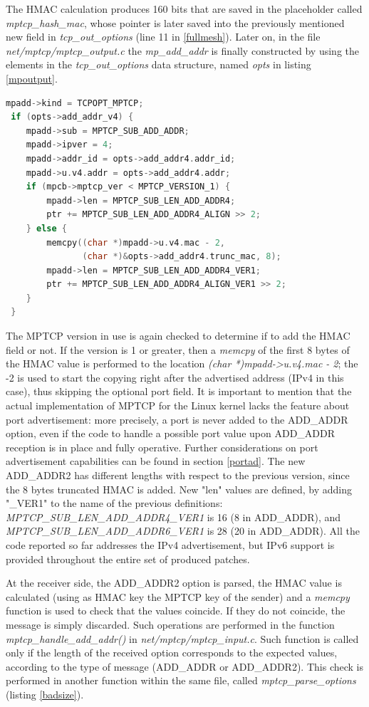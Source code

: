 The HMAC calculation produces 160 bits that are saved in the placeholder called \textit{mptcp\_hash\_mac}, whose pointer is later saved into the previously mentioned new field in \textit{tcp\_out\_options} (line 11 in \ref{fullmesh}).
Later on, in the file \textit{net/mptcp/mptcp\_output.c} the \textit{mp\_add\_addr} is finally constructed by using the elements in the \textit{tcp\_out\_options} data structure, named \textit{opts} in listing \ref{mpoutput}.

\begin{lstlisting}[language=c, caption=\textit{Building ADD\_ADDR2 output message}, label=mpoutput]
 mpadd->kind = TCPOPT_MPTCP;
 if (opts->add_addr_v4) {
 	mpadd->sub = MPTCP_SUB_ADD_ADDR;
 	mpadd->ipver = 4;
 	mpadd->addr_id = opts->add_addr4.addr_id;
 	mpadd->u.v4.addr = opts->add_addr4.addr;
 	if (mpcb->mptcp_ver < MPTCP_VERSION_1) {
 		mpadd->len = MPTCP_SUB_LEN_ADD_ADDR4;
 		ptr += MPTCP_SUB_LEN_ADD_ADDR4_ALIGN >> 2;
 	} else {
 		memcpy((char *)mpadd->u.v4.mac - 2,
 		       (char *)&opts->add_addr4.trunc_mac, 8);
 		mpadd->len = MPTCP_SUB_LEN_ADD_ADDR4_VER1;
 		ptr += MPTCP_SUB_LEN_ADD_ADDR4_ALIGN_VER1 >> 2;
 	}
 }
\end{lstlisting}

The MPTCP version in use is again checked to determine if to add the HMAC field or not. If the version is 1 or greater, then a \textit{memcpy} of the first 8 bytes of the HMAC value is performed to the location \textit{(char *)mpadd->u.v4.mac - 2}; the -2 is used to start the copying right after the advertised address (IPv4 in this case), thus skipping the optional port field. It is important to mention that the actual implementation of MPTCP for the Linux kernel lacks the feature about port advertisement: more precisely, a port is never added to the ADD\_ADDR option, even if the code to handle a possible port value upon ADD\_ADDR reception is in place and fully operative. Further considerations on port advertisement capabilities can be found in section \ref{portad}. The new ADD\_ADDR2 has different lengths with respect to the previous version, since the 8 bytes truncated HMAC is added. New "len" values are defined, by adding "\_VER1" to the name of the previous definitions: \textit{MPTCP\_SUB\_LEN\_ADD\_ADDR4\_VER1} is 16 (8 in ADD\_ADDR), and \textit{MPTCP\_SUB\_LEN\_ADD\_ADDR6\_VER1} is 28 (20 in ADD\_ADDR). All the code reported so far addresses the IPv4 advertisement, but IPv6 support is provided throughout the entire set of produced patches.


At the receiver side, the ADD\_ADDR2 option is parsed, the HMAC value is calculated (using as HMAC key the MPTCP key of the sender) and a \textit{memcpy} function is used to check that the values coincide. If they do not coincide, the message is simply discarded. Such operations are performed in the function \textit{mptcp\_handle\_add\_addr()} in \textit{net/mptcp/mptcp\_input.c}. Such function is called only if the length of the received option corresponds to the expected values, according to the type of message (ADD\_ADDR or ADD\_ADDR2). This check is performed in another function within the same file, called \textit{mptcp\_parse\_options} (listing \ref{badsize}).

